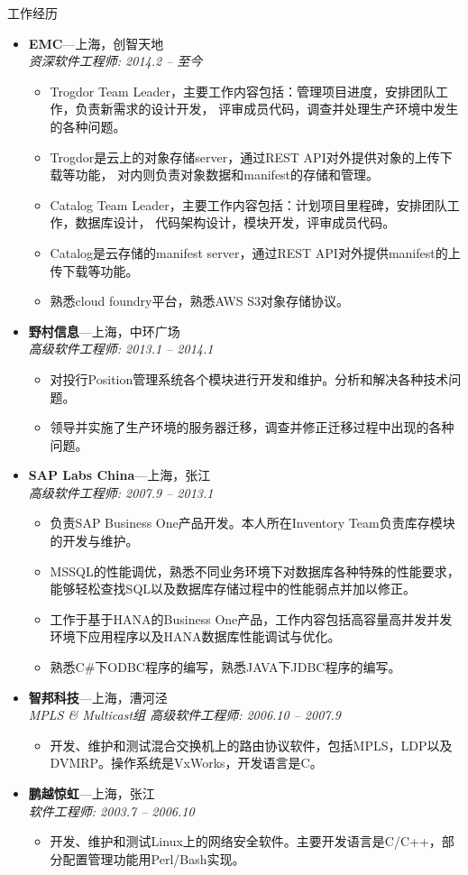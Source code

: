 \documentclass[11pt,oneside]{article}
\newenvironment{ressection}[1]{
	\vspace{4pt}
	{\selectfont\Large#1}
	\begin{itemize}
	\vspace{3pt}
}{
	\end{itemize}
}
\newcommand{\ressubitem}[1]{
	\vspace{-1pt}
	\item \begin{flushleft} #1 \end{flushleft}
}
\newcommand{\resbigitem}[3]{
	\vspace{-5pt}
	\item
	\textbf{#1}---#2 \\
	\textit{#3}
}
\newenvironment{ressubsec}[3]{
	\resbigitem{#1}{#2}{#3}
	\vspace{-2pt}
	\begin{itemize}
}{
    \end{itemize}
}
\begin{document}
\begin{ressection}{工作经历}

	\begin{ressubsec}{EMC}{上海，创智天地}{资深软件工程师: 2014.2 -- 至今}
		\ressubitem{Trogdor Team Leader，主要工作内容包括：管理项目进度，安排团队工作，负责新需求的设计开发，
					评审成员代码，调查并处理生产环境中发生的各种问题。}
		\ressubitem{Trogdor是云上的对象存储server，通过REST API对外提供对象的上传下载等功能，
					对内则负责对象数据和manifest的存储和管理。}
		\ressubitem{Catalog Team Leader，主要工作内容包括：计划项目里程碑，安排团队工作，数据库设计，
					代码架构设计，模块开发，评审成员代码。}
		\ressubitem{Catalog是云存储的manifest server，通过REST API对外提供manifest的上传下载等功能。}
		\ressubitem{熟悉cloud foundry平台，熟悉AWS S3对象存储协议。}
	\end{ressubsec}

	\begin{ressubsec}{野村信息}{上海，中环广场}{高级软件工程师: 2013.1 -- 2014.1}
		\ressubitem{对投行Position管理系统各个模块进行开发和维护。分析和解决各种技术问题。}
		\ressubitem{领导并实施了生产环境的服务器迁移，调查并修正迁移过程中出现的各种问题。}
	\end{ressubsec}

	\begin{ressubsec}{SAP Labs China}{上海，张江}{高级软件工程师: 2007.9 -- 2013.1}
		\ressubitem{负责SAP Business One产品开发。本人所在Inventory Team负责库存模块的开发与维护。}
		\ressubitem{MSSQL的性能调优，熟悉不同业务环境下对数据库各种特殊的性能要求，
					能够轻松查找SQL以及数据库存储过程中的性能弱点并加以修正。}
		\ressubitem{工作于基于HANA的Business One产品，工作内容包括高容量高并发并发环境下应用程序以及HANA数据库性能调试与优化。}
		\ressubitem{熟悉C\#下ODBC程序的编写，熟悉JAVA下JDBC程序的编写。}
	\end{ressubsec}

	\begin{ressubsec}{智邦科技}{上海，漕河泾}{MPLS \& Multicast组 高级软件工程师: 2006.10 -- 2007.9}
		\ressubitem{开发、维护和测试混合交换机上的路由协议软件，包括MPLS，LDP以及DVMRP。操作系统是VxWorks，开发语言是C。}
	\end{ressubsec}

	\begin{ressubsec}{鹏越惊虹}{上海，张江}{软件工程师: 2003.7 -- 2006.10}
		\ressubitem{开发、维护和测试Linux上的网络安全软件。主要开发语言是C/C++，部分配置管理功能用Perl/Bash实现。}
	\end{ressubsec}

\end{ressection}
\end{document}
